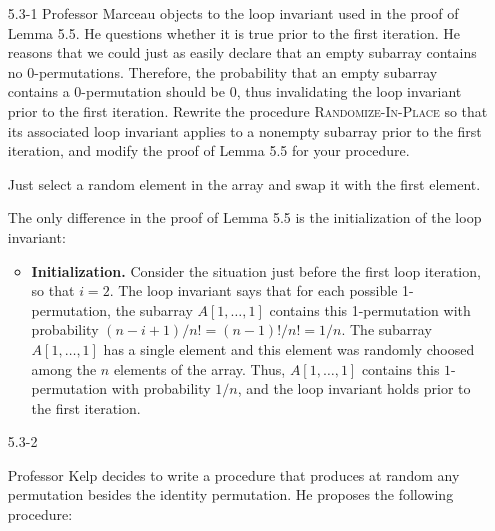 \begin{enumerate}

\item[5.3{-}1]{Professor Marceau objects to the loop invariant used in the proof
of Lemma 5.5. He questions whether it is true prior to the first iteration. He
reasons that we could just as easily declare that an empty subarray contains
no 0-permutations. Therefore, the probability that an empty subarray
contains a 0-permutation should be 0, thus invalidating the loop invariant
prior to the first iteration. Rewrite the procedure \textsc{Randomize-In-Place}
so that its associated loop invariant applies to a nonempty subarray prior
to the first iteration, and modify the proof of Lemma 5.5 for your procedure.}

\begin{framed}
Just select a random element in the array and swap it with the first element.

\begin{algorithm}[H]
\SetAlgoNoEnd\DontPrintSemicolon
\BlankLine
\end{algorithm}

The only difference in the proof of Lemma 5.5 is the initialization of the loop
invariant:
\begin{itemize}
  \item \textbf{Initialization.} Consider the situation just before the first
    loop iteration, so that $i = 2$. The loop invariant says that for each
    possible 1-permutation, the subarray $A[1, \dots, 1]$ contains this
    1-permutation with probability $(n - i + 1)/n! = (n - 1)!/n! = 1/n$. The
    subarray $A[1, \dots, 1]$ has a single element and this element was
    randomly choosed among the $n$ elements of the array. Thus, $A[1, \dots, 1]$
    contains this $1$-permutation with probability $1/n$, and the loop invariant
    holds prior to the first iteration.
\end{itemize}
\end{framed}

\item[5.3{-}2]{Professor Kelp decides to write a procedure that produces at
random any permutation besides the identity permutation. He proposes the
following procedure:

\begin{algorithm}[H]
\SetAlgoNoEnd\DontPrintSemicolon
\BlankLine
{}
\end{algorithm}

}
\end{enumerate}
